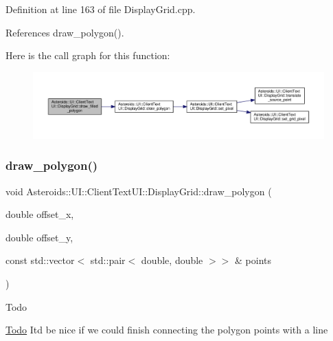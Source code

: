 Definition at line 163 of file Display\+Grid.\+cpp.



References draw\+\_\+polygon().

Here is the call graph for this function\+:\nopagebreak
\begin{figure}[H]
\begin{center}
\leavevmode
\includegraphics[width=350pt]{classAsteroids_1_1UI_1_1ClientTextUI_1_1DisplayGrid_a54cc7e12266f854d8047e99b7f547f22_cgraph}
\end{center}
\end{figure}
\mbox{\label{classAsteroids_1_1UI_1_1ClientTextUI_1_1DisplayGrid_aaf3c070c4d620f5a8420e349f5501bfd}} 
\subsubsection{\texorpdfstring{draw\+\_\+polygon()}{draw\_polygon()}}
{\footnotesize\ttfamily void Asteroids\+::\+U\+I\+::\+Client\+Text\+U\+I\+::\+Display\+Grid\+::draw\+\_\+polygon (\begin{DoxyParamCaption}\item[{double}]{offset\+\_\+x,  }\item[{double}]{offset\+\_\+y,  }\item[{const std\+::vector$<$ std\+::pair$<$ double, double $>$$>$ \&}]{points }\end{DoxyParamCaption})}

\begin{DoxyRefDesc}{Todo}
\item[\hyperlink{todo__todo000024}{Todo}]It\textquotesingle{}d be nice if we could finish connecting the polygon points with a line \end{DoxyRefDesc}


